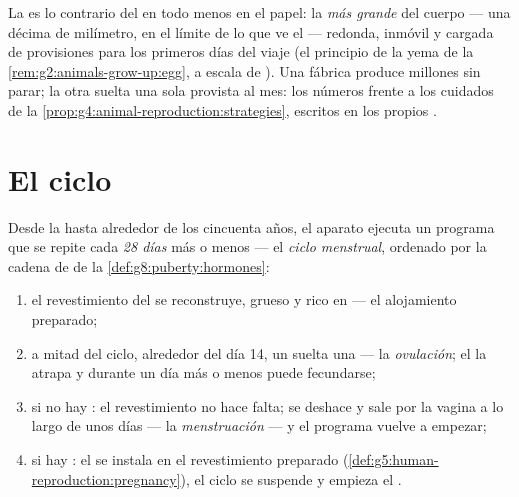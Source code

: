 \begin{example}\label{ex:g8:reproductive-systems:egg}
La   es lo contrario del  en todo menos en
el papel: la  \emph{más grande} del cuerpo --- una décima de
milímetro, en el límite de lo que ve el  --- redonda, inmóvil y
cargada de provisiones para los primeros días del viaje (el principio
de la yema de la \cref{rem:g2:animals-grow-up:egg}, a escala de
). Una fábrica produce millones sin parar; la otra suelta una
sola  provista al mes: los números frente a los cuidados de la
\cref{prop:g4:animal-reproduction:strategies}, escritos en los propios
.
\end{example}

\section{El ciclo}

\begin{proposition}\label{prop:g8:reproductive-systems:cycle}
Desde la  hasta alrededor de los cincuenta años, el aparato
 ejecuta un programa que se repite cada \emph{28 días} más o
menos --- el \emph{ciclo menstrual}, ordenado
por la cadena de  de la \cref{def:g8:puberty:hormones}:
\begin{enumerate}
  \item el revestimiento del  se reconstruye, grueso y rico en
         --- el alojamiento preparado;
  \item a mitad del ciclo, alrededor del día 14, un  suelta una
          --- la \emph{ovulación}; el
         la atrapa y durante un día más o menos puede
        fecundarse;
  \item si no hay : el revestimiento no hace falta; se
        deshace y sale por la vagina a lo largo de unos días --- la
        \emph{menstruación} --- y el programa vuelve
        a empezar;
  \item si hay : el  se instala en el revestimiento
        preparado (\cref{def:g5:human-reproduction:pregnancy}), el ciclo
        se suspende y empieza el .
\end{enumerate}
\end{proposition}
\admitted

